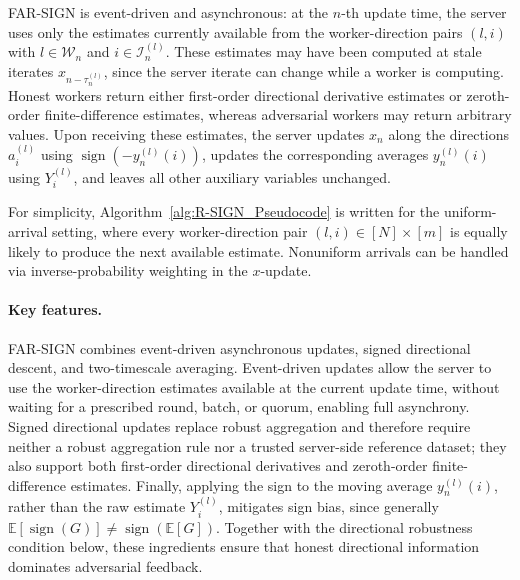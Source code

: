 \documentclass{article}
\DeclareMathOperator*{\sign}{sign}
\newcommand{\rsign}{R-SIGN\xspace}
\newcommand{\farsign}{FAR-SIGN\xspace}
\newcommand{\cI}{\mathcal{I}}
\newcommand{\cW}{\mathcal{W}}
\begin{document}
\farsign is event-driven and asynchronous: at the $n$-th update time, the server uses only the estimates currently available from the worker-direction pairs $(l,i)$ with $l\in\cW_n$ and $i\in\cI_n^{(l)}$. These estimates may have
been computed at stale iterates $x_{n-\tau_n^{(l)}}$, since the server iterate can change while a worker is computing. Honest workers return either first-order directional derivative estimates or zeroth-order finite-difference estimates, whereas adversarial workers may return arbitrary values. Upon receiving these estimates, the server updates $x_n$ along the 
directions $a_i^{(l)}$ using $\sign(-y_n^{(l)}(i))$, updates the corresponding averages $y_n^{(l)}(i)$ using $Y_i^{(l)}$, and leaves all other auxiliary variables unchanged.

For simplicity, Algorithm~\ref{alg:R-SIGN_Pseudocode} is written for the uniform-arrival setting, where every worker-direction pair $(l,i)\in[N]\times[m]$ is equally likely to produce the next available estimate. Nonuniform arrivals can be handled via inverse-probability weighting in the $x$-update.

\paragraph{Key features.}
\farsign combines event-driven asynchronous updates, signed directional descent, and two-timescale averaging. Event-driven updates allow the server to use the
worker-direction estimates available at the current update time, without waiting for a prescribed round, batch, or quorum, enabling full asynchrony. Signed
directional updates replace robust aggregation and therefore require neither a robust aggregation rule nor a trusted server-side reference dataset; they also
support both first-order directional derivatives and zeroth-order finite-difference estimates. Finally, applying the sign to the moving average $y_n^{(l)}(i)$, rather than the raw estimate $Y_i^{(l)}$, mitigates sign bias, since generally $\mathbb E[\sign(G)]\neq\sign(\mathbb E[G])$. Together with the
directional robustness condition below, these ingredients ensure that honest directional information dominates adversarial feedback.
\end{document}
